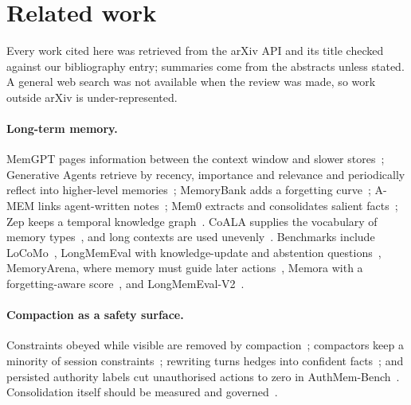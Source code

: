 \section{Related work}
\label{sec:related}

Every work cited here was retrieved from the arXiv API and its title checked against our bibliography
entry; summaries come from the abstracts unless stated. A general web search was not available when the
review was made, so work outside arXiv is under-represented.

\paragraph{Long-term memory.} MemGPT pages information between the context window and slower
stores~\citep{packer2023memgpt}; Generative Agents retrieve by recency, importance and relevance and
periodically reflect into higher-level memories~\citep{park2023generative}; MemoryBank adds a forgetting
curve~\citep{zhong2023memorybank}; A-MEM links agent-written notes~\citep{xu2025amem}; Mem0 extracts and
consolidates salient facts~\citep{chhikara2025mem0}; Zep keeps a temporal knowledge
graph~\citep{rasmussen2025zep}. CoALA supplies the vocabulary of memory types~\citep{sumers2023coala}, and
long contexts are used unevenly~\citep{liu2023lost}. Benchmarks include LoCoMo~\citep{maharana2024locomo},
LongMemEval with knowledge-update and abstention questions~\citep{wu2024longmemeval}, MemoryArena, where
memory must guide later actions~\citep{he2026memoryarena}, Memora with a forgetting-aware
score~\citep{uddin2026memora}, and LongMemEval-V2~\citep{wu2026longmemevalv2}.

\paragraph{Compaction as a safety surface.} Constraints obeyed while visible are removed by
compaction~\citep{chen2026governancedecay}; compactors keep a minority of session
constraints~\citep{wang2026lostincompaction}; rewriting turns hedges into confident
facts~\citep{kwon2026manufactured}; and persisted authority labels cut unauthorised actions to zero in
AuthMem-Bench~\citep{zhan2026authmem}. Consolidation itself should be measured and
governed~\citep{annapureddy2026epistemics}.

